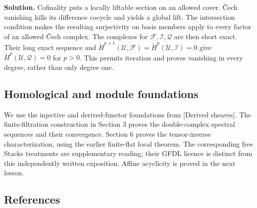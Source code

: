 \documentclass[11pt]{article}
\begin{document}
\textbf{Solution.} Cofinality puts a locally liftable section on an
allowed cover. Čech vanishing kills its difference cocycle and yields a
global lift. The intersection condition makes the resulting surjectivity
on basis members apply to every factor of an allowed Čech complex. The
complexes for \(\mathcal F,\mathcal I,\mathcal Q\) are then short exact.
Their long exact sequence and
\(\check H^{p+1}(\mathcal U,\mathcal F)=\check H^p(\mathcal U,\mathcal I)=0\)
give \(\check H^p(\mathcal U,\mathcal Q)=0\) for \(p>0\). This permits
iteration and proves vanishing in every degree, rather than only degree
one.

\subsection{Homological and module
foundations}\label{homological-and-module-foundations}

We use the injective and derived-functor foundations from {[}Derived
sheaves{]}. The finite-filtration construction in Section 3 proves the
double-complex spectral sequences and their convergence. Section 6
proves the tensor-inverse characterization, using the earlier
finite-flat local theorem. The corresponding free Stacks treatments are
supplementary reading; their GFDL licence is distinct from this
independently written exposition. Affine acyclicity is proved in the
next lesson.

\subsection{References}\label{references-1}
\end{document}
